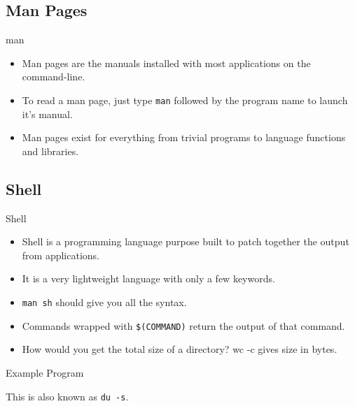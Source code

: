 \documentclass[10pt]{beamer}
\begin{document}
\subsection{Man Pages}
\begin{frame}{man}
\begin{itemize}[<+->]
\item Man pages are the manuals installed with most applications on the command-line.
\item To read a man page, just type \texttt{\color{blue}man} followed by the program name to launch it's manual.
\item Man pages exist for everything from trivial programs to language functions and libraries.
\end{itemize}
\end{frame}

\subsection{Shell}
\begin{frame}{Shell}
\begin{itemize}[<+->]
\item Shell is a programming language purpose built to patch together the output from applications.
\item It is a very lightweight language with only a few keywords.
\item \texttt{\color{blue}man sh} should give you all the syntax.
\item Commands wrapped with \texttt{\$(COMMAND)} return the output of that command.
\item How would you get the total size of a directory? \tiny{wc -c gives size in bytes}.
\end{itemize}
\end{frame}

\begin{frame}{Example Program}

This is also known as \texttt{\color{blue}du -s}.
\end{frame}
\end{document}
